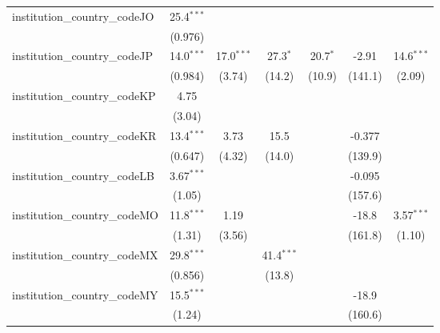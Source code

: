 \begin{tabular}{lcccccc}
   institution\_country\_codeJO          & 25.4$^{***}$  &              &              &               &               &   \\   
                                         & (0.976)       &              &              &               &               &   \\   
   institution\_country\_codeJP          & 14.0$^{***}$  & 17.0$^{***}$ & 27.3$^{*}$   & 20.7$^{*}$    & -2.91         & 14.6$^{***}$\\   
                                         & (0.984)       & (3.74)       & (14.2)       & (10.9)        & (141.1)       & (2.09)\\   
   institution\_country\_codeKP          & 4.75          &              &              &               &               &   \\   
                                         & (3.04)        &              &              &               &               &   \\   
   institution\_country\_codeKR          & 13.4$^{***}$  & 3.73         & 15.5         &               & -0.377        &   \\   
                                         & (0.647)       & (4.32)       & (14.0)       &               & (139.9)       &   \\   
   institution\_country\_codeLB          & 3.67$^{***}$  &              &              &               & -0.095        &   \\   
                                         & (1.05)        &              &              &               & (157.6)       &   \\   
   institution\_country\_codeMO          & 11.8$^{***}$  & 1.19         &              &               & -18.8         & 3.57$^{***}$\\   
                                         & (1.31)        & (3.56)       &              &               & (161.8)       & (1.10)\\   
   institution\_country\_codeMX          & 29.8$^{***}$  &              & 41.4$^{***}$ &               &               &   \\   
                                         & (0.856)       &              & (13.8)       &               &               &   \\   
   institution\_country\_codeMY          & 15.5$^{***}$  &              &              &               & -18.9         &   \\   
                                         & (1.24)        &              &              &               & (160.6)       &   \\   

\end{tabular}

